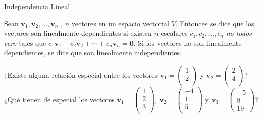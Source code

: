 \begin{frame}{Independencia Lineal}
  

      Sean $\bm{v}_1 , \bm{v}_2 , \ldots , \bm{v}_n$ , $n$ vectores en un espacio vectorial $V$. Entonces se dice que los vectores son \alert{linealmente dependientes} si existen $n$ escalares $c_1 , c_2 ,\ldots, c_n$ \emph{no todos cero} tales que $c_1 \bm{v}_1 + c_2 \bm{v}_2 + \cdots + c_n\bm{v}_n = \bm{0}$.  Si los vectores no son linealmente dependientes, se dice que son \alert{linealmente independientes}.


    ¿Existe alguna relación especial entre los vectores $\bm{v}_1 =
    \begin{pmatrix}
      1\\
      2\\
    \end{pmatrix}
$ y $\bm{v}_2 =
    \begin{pmatrix}
      2\\
      4\\
    \end{pmatrix}$? ¿Qué tienen de especial los vectores $\bm{v}_1 =
    \begin{pmatrix}
      1\\
      2\\
      3\\
    \end{pmatrix}
$, $\bm{v}_2 =
    \begin{pmatrix}
      -4\\
      1\\
5\\
    \end{pmatrix}$ y $\bm{v}_3 =
    \begin{pmatrix}
      -5\\
      8\\
19
    \end{pmatrix}$?
\end{frame}

